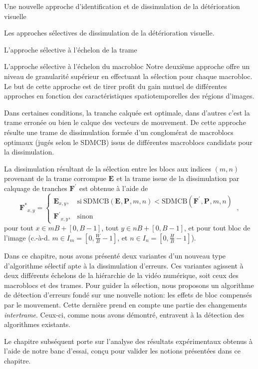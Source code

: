 \documentclass[letterpaper, twoside, 12pt,memoire]{thETS}
\newcommand{\SC}[1]{%
	{
	\todo[inline,color={red!100!green!33!}]{%
	\textbf{[SC]:}~#1}
	}}
\newcommand{\ltE}[1]{\mathbf{E}_{#1}}
\newcommand{\ltP}[1]{\mathbf{P}_{#1}}
\newcommand{\ltS}[1]{I_{#1}}
\newcommand{\ltSDMCB}[1]{\textrm{SDMCB}(#1,\ltP{},m,n)}
\newcommand{\ltConc}[1]{\mathbf{F^{\prime}}_{#1}}
\newcommand{\ltOpt}[1]{\mathbf{F^{*}}_{#1}}
\providecommand{\DIFaddbegin}{} %
\providecommand{\DIFaddend}{} %
\begin{document}
\begin{chapter}{Une nouvelle approche d'identification et de dissimulation de la
détérioration visuelle}
\begin{section}{Les approches sélectives de dissimulation de la détérioration
visuelle.}
\begin{subsection}{L'approche sélective à l'échelon de la trame}
\end{subsection}

\begin{subsection}{L'approche sélective à l'échelon du macrobloc}
\DIFaddbegin \SC{à l'échel?}
\DIFaddend \label{sect-SelectiveBloc}
Notre deuxième approche offre un niveau de granularité supérieur en effectuant
la sélection pour chaque macrobloc. Le but de cette approche est de tirer
profit du gain mutuel de différentes approches en fonction des
caractéristiques spatiotemporelles des régions d'images.

Dans certaines conditions, la tranche calquée est optimale, dans d'autres c'est
la trame erronée ou bien le calque des vecteurs de mouvement. De cette approche
résulte une trame de dissimulation formée d'un conglomérat de macroblocs
optimaux (jugés selon le SDMCB) issus de différentes macroblocs candidats pour la
dissimulation.

La dissimulation résultant de la sélection entre les blocs aux indices $(m,n)$
provenant de la trame corrompue $\ltE{}$ et la trame issue de la dissimulation
par calquage de tranches $\ltConc{}$ est obtenue à l'aide de
\begin{equation}
\label{eq-SelectiveConcealment}
\ltOpt{x,y} =
\begin{cases}
\ltE{x,y}, & \mathrm{si~} \ltSDMCB{\ltE{}} < \ltSDMCB{\ltConc{}}\\
\ltConc{x,y}, & \mathrm{sinon}
\end{cases}\:,
\end{equation}
pour tout $x\in mB+[0,B-1]$, tout $y \in nB+[0,B-1]$, et pour tout bloc de l'image (c.-à-d. $m \in \ltS{m}=[0,\frac{W}{B}-1]$, et $n \in
\ltS{n}=[0,\frac{H}{B}-1]$).
\end{subsection}
\end{section}

Dans ce chapitre, nous avons présenté deux variantes d'un nouveau type
d'algorithme sélectif apte à la dissimulation d'erreurs. Ces variantes agissent
à deux différents échelons de la hiérarchie de la vidéo numérique, soit ceux des
macroblocs et des trames. Pour guider la sélection, nous proposons un algorithme
de détection d'erreurs fondé sur une nouvelle notion: les effets de bloc
compensés par le mouvement. Cette dernière prend en compte une partie des
changements \textit{intertrame}. Ceux-ci, comme nous avons démontré,
entravent à la détection des algorithmes existants.

Le chapitre subséquent porte sur l'analyse des résultats expérimentaux obtenus
à l'aide de notre banc d'essai, conçu pour valider les notions présentées dans
ce chapitre.




\end{chapter}
\end{document}
